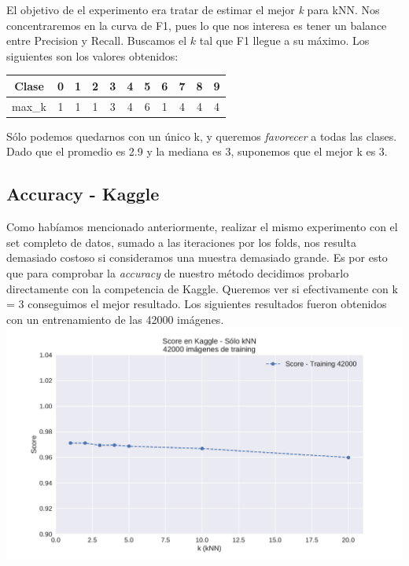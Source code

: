El objetivo de el experimento era tratar de estimar el mejor \textit{k} para kNN. Nos concentraremos en la curva de F1, pues lo que nos interesa es tener un balance entre Precision y Recall. Buscamos el $k$ tal que F1 llegue a su máximo. Los siguientes son los valores obtenidos: \\

\begin{center}
    \begin{tabular}{| c | c | c | c | c | c | c | c | c | c | c |}
    \hline
    Clase   & 0 & 1 & 2 & 3 & 4 & 5 & 6 & 7 & 8 & 9  \\ \hline
    max_k       & 1 & 1 & 1 & 3 & 4 & 6 & 1 & 4 & 4 & 4  \\ \hline
    \end{tabular}
\end{center}

Sólo podemos quedarnos con un único k, y queremos \textit{favorecer} a todas las clases. Dado que el promedio es 2.9 y la mediana es 3, suponemos que el mejor k es 3.



\newpage
\subsection{Accuracy - Kaggle}

Como habíamos mencionado anteriormente, realizar el mismo experimento con el set completo de datos, sumado a las iteraciones por los folds, nos resulta demasiado costoso si consideramos una muestra demasiado grande. Es por esto que para comprobar la \textit{accuracy} de nuestro método decidimos probarlo directamente con la competencia de Kaggle. Queremos ver si efectivamente con k = 3 conseguimos el mejor resultado. Los siguientes resultados fueron obtenidos con un entrenamiento de las 42000 imágenes.\\

{\centering
    \includegraphics[scale=0.60]{informe/imagenes/knn/kaggleknn.pdf} \\
}
$ $\newline

